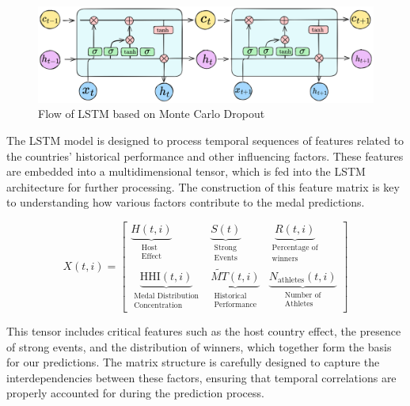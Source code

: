 \documentclass{mcmthesis}
\newenvironment{featurebox}[1]{%
	\begin{tcolorbox}[
		colback=white,                  %
		colframe=customblue,            %
		colbacktitle=customblue,        %
		coltitle=deepblue,              %
		arc=3mm,                        %
		boxrule=1.5pt,                  %
		title={\large\bfseries #1},     %
		fonttitle=\sffamily,            %
		top=10pt,                       %
		bottom=10pt,                    %
		left=10pt,                      %
		right=10pt,                     %
		]
	}{\end{tcolorbox}}
\begin{document}
	\begin{figure}[H]
		\centering
		\includegraphics[width=1\linewidth]{fig/LSTM2.png}
		\caption{Flow of LSTM based on Monte Carlo Dropout}
		\label{fig:LSTM}
	\end{figure}
	The LSTM model is designed to process temporal sequences of features related to the countries' historical performance and other influencing factors. These features are embedded into a multidimensional tensor, which is fed into the LSTM architecture for further processing. The construction of this feature matrix is key to understanding how various factors contribute to the medal predictions.
\begin{featurebox}{Multidimensional Tensor Construction}
	\[
	X(t,i) = \begin{bmatrix}
		\underbrace{H(t,i)}_{\substack{\text{Host}\\ \text{Effect}}} & 
		\underbrace{S(t)}_{\substack{\text{Strong}\\ \text{Events}}} & 
		\underbrace{R(t,i)}_{\substack{\text{Percentage of}\\ \text{winners}}} \\
		\underbrace{\text{HHI}(t,i)}_{\substack{\text{Medal Distribution}\\ \text{Concentration}}} & 
		\underbrace{\widetilde{MT}(t,i)}_{\substack{\text{Historical}\\ \text{Performance}}} &
		\underbrace{N_{\text{athletes}}(t,i)}_{\substack{\text{Number of}\\ \text{Athletes}}}
	\end{bmatrix}
	\]
\end{featurebox}
This tensor includes critical features such as the host country effect, the presence of strong events, and the distribution of winners, which together form the basis for our predictions. The matrix structure is carefully designed to capture the interdependencies between these factors, ensuring that temporal correlations are properly accounted for during the prediction process.
\end{document}
